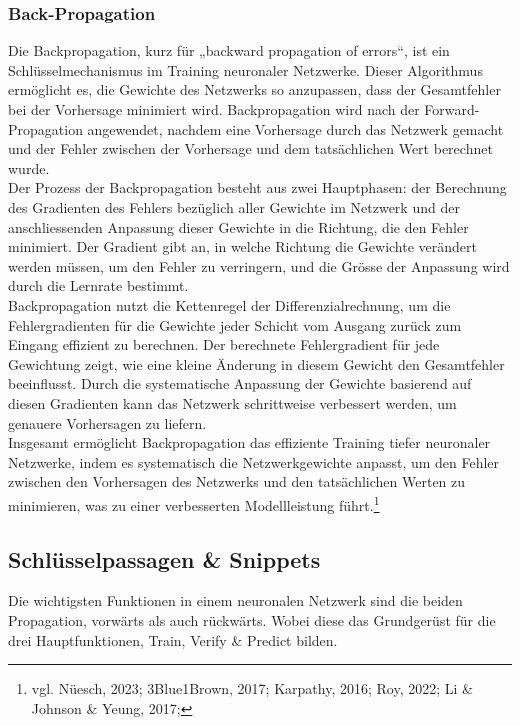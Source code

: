 \subsubsection{Back-Propagation}
\label{sec:RealBackPropagation}
Die Backpropagation, kurz für „backward propagation of errors“, ist ein Schlüsselmechanismus im Training neuronaler Netzwerke. Dieser Algorithmus ermöglicht es, die Gewichte des Netzwerks so anzupassen, dass der Gesamtfehler bei der Vorhersage minimiert wird. Backpropagation wird nach der Forward-Propagation angewendet, nachdem eine Vorhersage durch das Netzwerk gemacht und der Fehler zwischen der Vorhersage und dem tatsächlichen Wert berechnet wurde.
\\
Der Prozess der Backpropagation besteht aus zwei Hauptphasen: der Berechnung des Gradienten des Fehlers bezüglich aller Gewichte im Netzwerk und der anschliessenden Anpassung dieser Gewichte in die Richtung, die den Fehler minimiert. Der Gradient gibt an, in welche Richtung die Gewichte verändert werden müssen, um den Fehler zu verringern, und die Grösse der Anpassung wird durch die Lernrate bestimmt.
\\
Backpropagation nutzt die Kettenregel der Differenzialrechnung, um die Fehlergradienten für die Gewichte jeder Schicht vom Ausgang zurück zum Eingang effizient zu berechnen. Der berechnete Fehlergradient für jede Gewichtung zeigt, wie eine kleine Änderung in diesem Gewicht den Gesamtfehler beeinflusst. Durch die systematische Anpassung der Gewichte basierend auf diesen Gradienten kann das Netzwerk schrittweise verbessert werden, um genauere Vorhersagen zu liefern.
\\
Insgesamt ermöglicht Backpropagation das effiziente Training tiefer neuronaler Netzwerke, indem es systematisch die Netzwerkgewichte anpasst, um den Fehler zwischen den Vorhersagen des Netzwerks und den tatsächlichen Werten zu minimieren, was zu einer verbesserten Modellleistung führt.\footnote{vgl. Nüesch, 2023; 3Blue1Brown, 2017; Karpathy, 2016; Roy, 2022; Li \& Johnson \& Yeung, 2017; }
\subsection{Schlüsselpassagen \& Snippets}
\label{sec:RealSnippetsCode}
Die wichtigsten Funktionen in einem neuronalen Netzwerk sind die beiden Propagation, vorwärts als auch rückwärts. Wobei diese das Grundgerüst für die drei Hauptfunktionen, Train, Verify \& Predict bilden.

